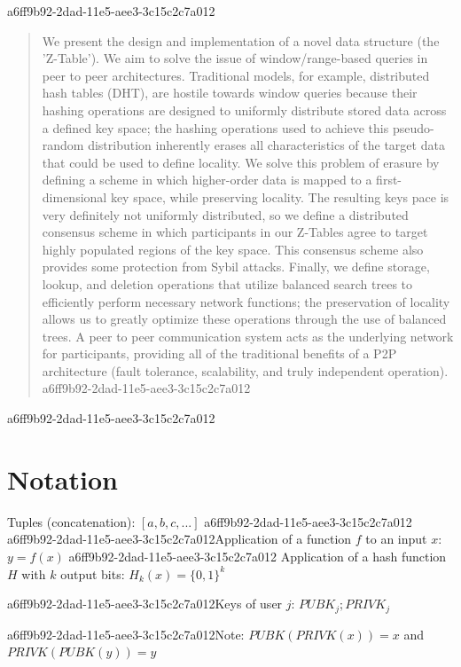 \documentclass[12pt]{article}
\begin{document}
\maketitle
a6ff9b92-2dad-11e5-aee3-3c15c2c7a012
\begin{abstract}
We present the design and implementation of a novel data structure (the 'Z-Table'). We aim to solve the issue of window/range-based queries in peer to peer architectures. Traditional models, for example,  distributed hash tables (DHT), are hostile towards window queries because their hashing operations are designed to uniformly distribute stored data across a defined key space; the hashing operations used to achieve this pseudo-random distribution inherently erases all characteristics of the target data that could be used to define locality. We solve this problem of erasure by defining a scheme in which higher-order data is mapped to a first-dimensional key space, while preserving locality. The resulting keys pace is very definitely not uniformly distributed, so we define a distributed consensus scheme in which participants in our Z-Tables agree to target highly populated regions of the key space. This consensus scheme also provides some protection from Sybil attacks. Finally, we define storage, lookup, and deletion operations that utilize balanced search trees to efficiently perform necessary network functions; the preservation of locality allows us to greatly optimize these operations through the use of balanced trees. A peer to peer communication system acts as the underlying network for participants, providing all of the traditional benefits of a P2P architecture (fault tolerance, scalability, and truly independent operation).
a6ff9b92-2dad-11e5-aee3-3c15c2c7a012\end{abstract}

a6ff9b92-2dad-11e5-aee3-3c15c2c7a012\section{Notation}

Tuples (concatenation): $[a,b,c,...]$
a6ff9b92-2dad-11e5-aee3-3c15c2c7a012
a6ff9b92-2dad-11e5-aee3-3c15c2c7a012Application of a function $f$ to an input $x$: $y=f(x)$
a6ff9b92-2dad-11e5-aee3-3c15c2c7a012
Application of a hash function $H$ with $k$ output bits: $H_{k}(x) = \{0,1\}^k$

a6ff9b92-2dad-11e5-aee3-3c15c2c7a012Keys of user $j$: $ PUBK_j; PRIVK_j $

a6ff9b92-2dad-11e5-aee3-3c15c2c7a012Note: $PUBK(PRIVK(x)) = x$ and $PRIVK(PUBK(y)) = y$~
\end{document}
